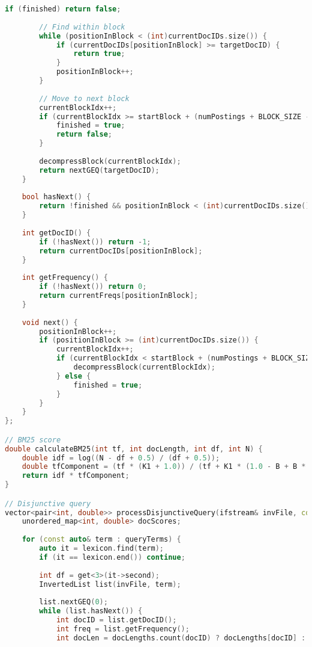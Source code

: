 \documentclass[11pt, a4paper]{report}
\begin{document}
\begin{lstlisting}[language=C++, caption={The complete source code for the query processor.}, label={lst:query}]
        if (finished) return false;
        
        // Find within block
        while (positionInBlock < (int)currentDocIDs.size()) {
            if (currentDocIDs[positionInBlock] >= targetDocID) {
                return true;
            }
            positionInBlock++;
        }
        
        // Move to next block
        currentBlockIdx++;
        if (currentBlockIdx >= startBlock + (numPostings + BLOCK_SIZE - 1) / BLOCK_SIZE) {
            finished = true;
            return false;
        }
        
        decompressBlock(currentBlockIdx);
        return nextGEQ(targetDocID);
    }
    
    bool hasNext() {
        return !finished && positionInBlock < (int)currentDocIDs.size();
    }
    
    int getDocID() {
        if (!hasNext()) return -1;
        return currentDocIDs[positionInBlock];
    }
    
    int getFrequency() {
        if (!hasNext()) return 0;
        return currentFreqs[positionInBlock];
    }
    
    void next() {
        positionInBlock++;
        if (positionInBlock >= (int)currentDocIDs.size()) {
            currentBlockIdx++;
            if (currentBlockIdx < startBlock + (numPostings + BLOCK_SIZE - 1) / BLOCK_SIZE) {
                decompressBlock(currentBlockIdx);
            } else {
                finished = true;
            }
        }
    }
};

// BM25 score
double calculateBM25(int tf, int docLength, int df, int N) {
    double idf = log((N - df + 0.5) / (df + 0.5));
    double tfComponent = (tf * (K1 + 1.0)) / (tf + K1 * (1.0 - B + B * (docLength / avgDocLength)));
    return idf * tfComponent;
}

// Disjunctive query
vector<pair<int, double>> processDisjunctiveQuery(ifstream& invFile, const vector<string>& queryTerms) {
    unordered_map<int, double> docScores;
    
    for (const auto& term : queryTerms) {
        auto it = lexicon.find(term);
        if (it == lexicon.end()) continue;
        
        int df = get<3>(it->second);
        InvertedList list(invFile, term);
        
        list.nextGEQ(0);
        while (list.hasNext()) {
            int docID = list.getDocID();
            int freq = list.getFrequency();
            int docLen = docLengths.count(docID) ? docLengths[docID] : (int)avgDocLength;
            

\end{lstlisting}
\end{document}

